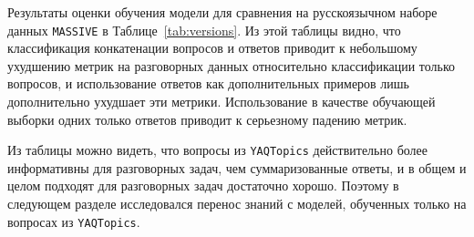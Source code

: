 Результаты оценки обучения модели для сравнения на русскоязычном наборе данных \texttt{MASSIVE} в Таблице~\ref{tab:versions}. Из этой таблицы видно, что классификация конкатенации вопросов и ответов приводит к небольшому ухудшению метрик на разговорных данных относительно классификации только вопросов, и использование ответов как дополнительных примеров лишь дополнительно ухудшает эти метрики. Использование в качестве обучающей выборки одних только ответов приводит к серьезному падению метрик.


Из таблицы можно видеть, что вопросы из \texttt{YAQTopics} действительно более информативны для разговорных задач, чем суммаризованные ответы, и в общем и целом подходят для разговорных задач достаточно хорошо. Поэтому в следующем разделе исследовался перенос знаний с моделей, обученных только на вопросах из \texttt{YAQTopics}.
%
\begin{table*}
\centering
{}
\caption{Параметры различных базовых моделей, рассмотренных в этой главе}
\label{tab:backbones}
\end{table*}

